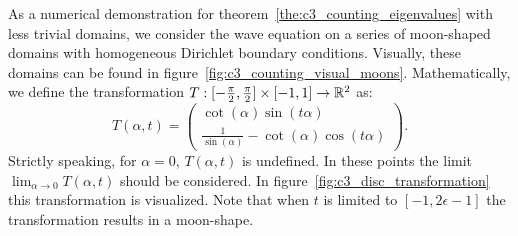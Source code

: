 As a numerical demonstration for theorem~\ref{the:c3_counting_eigenvalues} with less trivial domains, we consider the wave equation on a series of moon-shaped domains with homogeneous Dirichlet boundary conditions. Visually, these domains can be found in figure~\ref{fig:c3_counting_visual_moons}. Mathematically, we define the transformation $T:[-\frac{\pi}{2}, \frac{\pi}{2}] \times [-1, 1] \to \mathbb{R}^2$ as:
\begin{equation}\label{equ:c3_disc_transformation}
  T(\alpha, t) = \begin{pmatrix}
    \cot(\alpha) \sin(t \alpha) \\
    \frac{1}{\sin(\alpha)} - \cot(\alpha) \cos(t \alpha)
  \end{pmatrix}\text{.}
\end{equation}
Strictly speaking, for $\alpha = 0$,  $T(\alpha, t)$ is undefined. In these points the limit $\lim_{\alpha \to 0} T(\alpha, t)$ should be considered. In figure~\ref{fig:c3_disc_transformation} this transformation is visualized. Note that when $t$ is limited to $[-1, 2\epsilon -1]$ the transformation results in a moon-shape.

